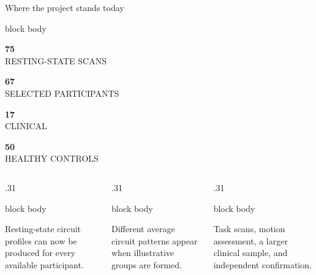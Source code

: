 \documentclass[aspectratio=169,10pt]{beamer}
\newcommand{\kpi}[2]{%
  \begin{minipage}[c][0.82cm][c]{0.22\textwidth}\centering
    {\color{Navy}\fontsize{22}{22}\selectfont\bfseries #1}\\[1pt]
    {\color{Muted}\scriptsize\MakeUppercase{#2}}
  \end{minipage}}
\begin{document}
\begin{frame}{Where the project stands today}
\centering
\begin{beamercolorbox}[rounded=true,sep=.12cm,wd=.96\textwidth]{block body}
  \kpi{75}{resting-state scans}\kpi{67}{selected participants}\kpi{17}{clinical}\kpi{50}{healthy controls}
\end{beamercolorbox}

\vspace{.48cm}
\begin{columns}[T,onlytextwidth]
  \begin{column}{.31\textwidth}
    \begin{beamercolorbox}[rounded=true,sep=.30cm]{block body}
      {\color{Teal}\large\faCheckCircle}\par\vspace{.18cm}
      \small Resting-state circuit profiles can now be produced for every available participant.
    \end{beamercolorbox}
  \end{column}
  \begin{column}{.31\textwidth}
    \begin{beamercolorbox}[rounded=true,sep=.30cm]{block body}
      {\color{Amber}\large\faEye}\par\vspace{.18cm}
      \small Different average circuit patterns appear when illustrative groups are formed.
    \end{beamercolorbox}
  \end{column}
  \begin{column}{.31\textwidth}
    \begin{beamercolorbox}[rounded=true,sep=.30cm]{block body}
      {\color{Red}\large\faHourglassHalf}\par\vspace{.18cm}
      \small Task scans, motion assessment, a larger clinical sample, and independent confirmation.
    \end{beamercolorbox}
  \end{column}
\end{columns}

\vspace{.48cm}
\end{frame}
\end{document}

